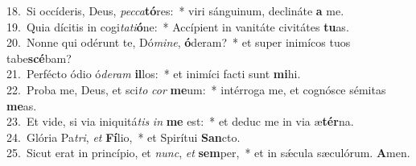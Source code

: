 {18.~}Si occíderis, Deus, \textit{pec}\textit{ca}\textbf{tó}res:~* viri sánguinum, declináte \textbf{a} me.\\
{19.~}Quia dícitis in cogi\textit{ta}\textit{ti}\textbf{ó}ne:~* Accípient in vanitáte civitátes \textbf{tu}as.\\
{20.~}Nonne qui odérunt te, Dó\textit{mi}\textit{ne}, \textbf{ó}deram?~* et super inimícos tuos tabe\textbf{scé}bam?\\
{21.~}Perfécto ódio ó\textit{de}\textit{ram} \textbf{il}los:~* et inimíci facti sunt \textbf{mi}hi.\\
{22.~}Proba me, Deus, et sci\textit{to} \textit{cor} \textbf{me}um:~* intérroga me, et cognósce sémitas \textbf{me}as.\\
{23.~}Et vide, si via iniquitá\textit{tis} \textit{in} \textbf{me} est:~* et deduc me in via æ\textbf{tér}na.\\
{24.~}Glória Pa\textit{tri}, \textit{et} \textbf{Fí}lio,~* et Spirítui \textbf{San}cto.\\
{25.~}Sicut erat in princípio, et \textit{nunc}, \textit{et} \textbf{sem}per,~* et in sǽcula sæculórum. \textbf{A}men.\\
